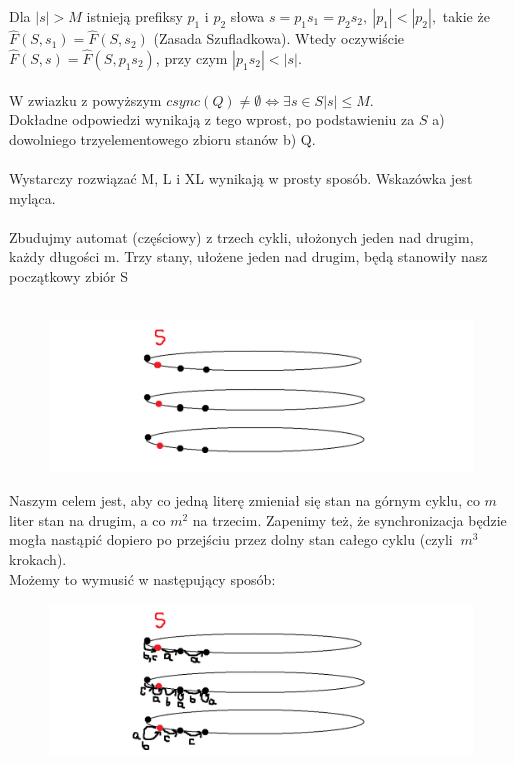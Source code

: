 \documentclass[a4paper,11pt]{article}
\newenvironment{zadanie}[1]
  {\renewcommand\theinnercustomthm{#1}\innercustomthm}
  {\endinnercustomthm}
\begin{document}
Dla $|s| > M$ istnieją prefiksy $p_1$ i $p_2$ słowa $s = p_1s_1 = p_2s_2, \ |p_1| < |p_2|,$ takie że 
$\widehat{F}(S,s_1) = \widehat{F}(S,s_2)$ (Zasada Szufladkowa). Wtedy oczywiście $\widehat{F}(S,s) = \widehat{F}(S,p_1s_2)$, przy czym 
$|p_1s_2| < |s|$. \\ \\
W zwiazku z powyższym $csync(Q) \neq \emptyset \Longleftrightarrow \exists s \in S |s| \leqslant M$. \\
Dokładne odpowiedzi wynikają z tego wprost, po podstawieniu za $S$ a) dowolniego trzyelementowego zbioru stanów b) Q. \\ \\

\begin{zadanie}{42}
\end{zadanie}
Wystarczy rozwiązać M, L i XL wynikają w prosty sposób. Wskazówka jest myląca. \\ \\

Zbudujmy automat (częściowy) z trzech cykli, ułożonych jeden nad drugim, każdy długości m. Trzy stany, ułożene jeden nad
drugim, będą stanowiły nasz początkowy zbiór S \\ \\

\begin{figure}[h!]
  \centerline{%
    \includegraphics[width=18cm]{zad42.png}%
  }%
\end{figure}

Naszym celem jest, aby co jedną literę zmieniał się stan na górnym cyklu, co $m$ liter stan na drugim, a co $m^2$ na trzecim.
Zapenimy też, że synchronizacja będzie mogła nastąpić dopiero po przejściu przez dolny stan całego cyklu (czyli $~m^3$ krokach). \\
Możemy to wymusić w następujący sposób: \\

\begin{figure}[h!]
  \centerline{%
    \includegraphics[width=18cm]{zad42_2.png}%
  }%
\end{figure}
\end{document}
